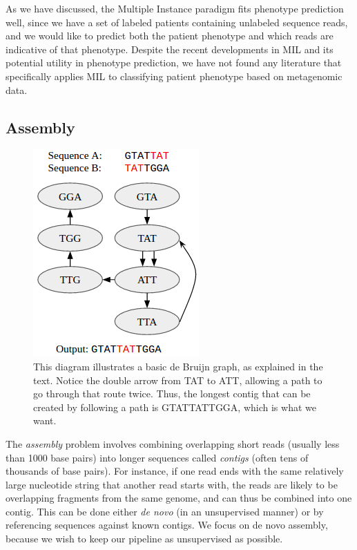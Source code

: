 As we have discussed, the Multiple Instance paradigm fits phenotype prediction well, since we have a set of labeled patients containing unlabeled sequence reads, and we would like to predict both the patient phenotype and which reads are indicative of that phenotype. Despite the recent developments in MIL and its potential utility in phenotype prediction, we have not found any literature that specifically applies MIL to classifying patient phenotype based on metagenomic data.

\subsection{Assembly}

\begin{figure}[h]
\centering
\includegraphics[scale=0.5]{./de-bruijn.png}
\caption{This diagram illustrates a basic de Bruijn graph, as explained in the text. Notice the double arrow from TAT to ATT, allowing a path to go through that route twice. Thus, the longest contig that can be created by following a path is GTATTATTGGA, which is what we want.} \label{de-bruijn}
\end{figure}

The \emph{assembly} problem involves combining overlapping short reads (usually less than 1000 base pairs) into longer sequences called \emph{contigs} (often tens of thousands of base pairs). For instance, if one read ends with the same relatively large nucleotide string that another read starts with, the reads are likely to be overlapping fragments from the same genome, and can thus be combined into one contig. This can be done either \emph{de novo} (in an unsupervised manner) or by referencing sequences against known contigs. We focus on de novo assembly, because we wish to keep our pipeline as unsupervised as possible. 


